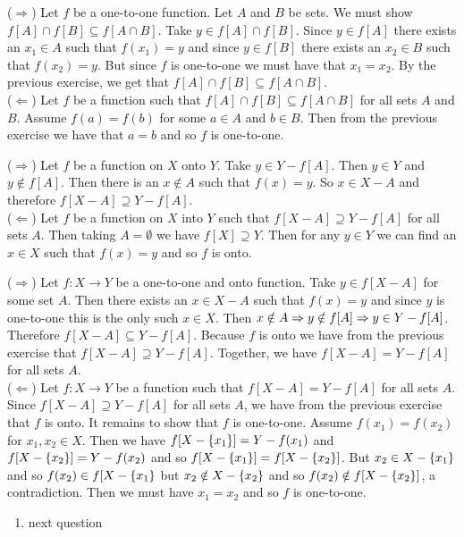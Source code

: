 \documentclass[12pt]{book}
\begin{document}
\begin{enumerate}
{($\Rightarrow$) Let $f$ be a one-to-one function. Let $A$ and $B$ be sets. We must show $f[A]\cap f[B]\subseteq f[A\cap B]$. Take $y\in f[A]\cap f[B]$. Since $y\in f[A]$ there exists an $x_1\in A$ such that $f(x_1)=y$ and since $y\in f[B]$ there exists an $x_2\in B$ such that $f(x_2)=y$. But since $f$ is one-to-one we must have that $x_1=x_2$. By the previous exercise, we get that $f[A]\cap f[B]\subseteq f[A\cap B]$.\\($\Leftarrow$) Let $f$ be a function such that $f[A]\cap f[B]\subseteq f[A\cap B]$ for all sets $A$ and $B$. Assume $f(a)=f(b)$ for some $a\in A$ and $b\in B$. Then from the previous exercise we have that $a=b$ and so $f$ is one-to-one.}

{($\Rightarrow$) Let $f$ be a function on $X$ onto $Y$. Take $y\in Y-f[A]$. Then $y\in Y$ and $y\notin f[A]$. Then there is an $x\notin A$ such that $f(x)=y$. So $x\in X-A$ and therefore $f[X-A]\supseteq Y-f[A]$.\\($\Leftarrow$) Let $f$ be a function on $X$ into $Y$ such that $f[X-A]\supseteq Y-f[A]$ for all sets $A$. Then taking $A=\emptyset$ we have $f[X]\supseteq Y$. Then for any $y\in Y$ we can find an $x\in X$ such that $f(x)=y$ and so $f$ is onto.}

{($\Rightarrow$) Let $f:X\rightarrow Y$ be a one-to-one and onto function. Take $y\in f[X-A]$ for some set $A$. Then there exists an $x\in X-A$ such that $f(x)=y$ and since $y$ is one-to-one this is the only such $x\in X$. Then $x\notin A \Rightarrow y\notin f[A] \Rightarrow y\in Y-f[A]$. Therefore $f[X-A]\subseteq Y-f[A]$. Because $f$ is onto we have from the previous exercise that $f[X-A]\supseteq Y-f[A]$. Together, we have $f[X-A]=Y-f[A]$ for all sets $A$.\\($\Leftarrow$) Let $f:X\rightarrow Y$ be a function such that $f[X-A]=Y-f[A]$ for all sets $A$. Since $f[X-A]\supseteq Y-f[A]$ for all sets $A$, we have from the previous exercise that $f$ is onto. It remains to show that $f$ is one-to-one. Assume $f(x_1)=f(x_2)$ for $x_1,x_2\in X$. Then we have $f[X-\{x_1\}]=Y-f(x_1)$ and $f[X-\{x_2\}]=Y-f(x_2)$ and so $f[X-\{x_1\}]=f[X-\{x_2\}]$. But $x_2\in X-\{x_1\}$ and so $f(x_2)\in f[X-\{x_1\}$ but $x_2\notin X-\{x_2\}$ and so $f(x_2)\notin f[X-\{x_2\}]$, a contradiction. Then we must have $x_1=x_2$ and so $f$ is one-to-one.}

\end{enumerate}

\hrulefill

\renewcommand{\labelenumi}{1.8.\arabic{enumi}}
\begin{enumerate}

\item next question


\end{enumerate}
\end{document}
